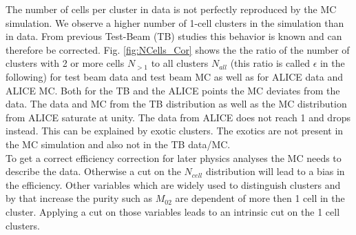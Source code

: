 \documentclass[ALICE]{ALICE_analysis_notes}
\begin{document}
The number of cells per cluster in data is not perfectly reproduced by the MC simulation. We observe a higher number of 1-cell clusters in the simulation than in data. From previous Test-Beam (TB) studies this behavior is known and can therefore be corrected. 
Fig. \ref{fig:NCells_Cor} shows the the ratio of the number of clusters with 2 or more cells $N_{>1}$ to all clusters $N_{all}$ (this ratio is called $\epsilon$  in the following) for test beam data and test beam MC as well as for ALICE data and ALICE MC. Both for the TB and the ALICE points the MC deviates from the data. The data and MC from the TB distribution as well as the MC distribution from ALICE saturate at unity. The data from ALICE does not reach 1 and drops instead. This can be explained by exotic clusters. The exotics are not present in the MC simulation and also not in the TB data/MC.\\
To get a correct efficiency correction for later physics analyses the MC needs to describe the data. Otherwise a cut on the $N_{cell}$ distribution will lead to a bias in the efficiency. Other variables which are widely used to distinguish clusters and by that increase the purity such as $M_{02}$ are dependent of more then 1 cell in the cluster. Applying a cut on those variables leads to an intrinsic cut on the 1 cell clusters.\\
\end{document}
